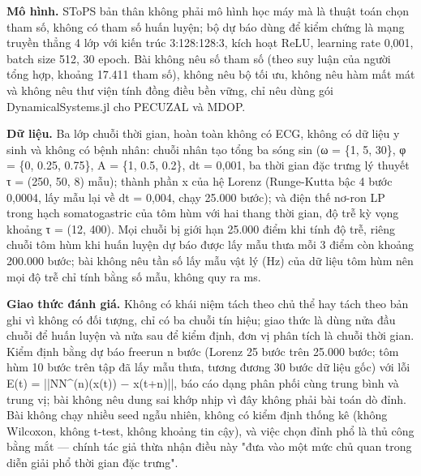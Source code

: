 \documentclass[12pt,a4paper]{article}
\begin{document}
\noindent \textbf{Mô hình.} SToPS bản thân không phải mô hình học máy mà là thuật toán chọn tham số, không có tham số huấn luyện; bộ dự báo dùng để kiểm chứng là mạng truyền thẳng 4 lớp với kiến trúc 3:128:128:3, kích hoạt ReLU, learning rate 0,001, batch size 512, 30 epoch. Bài không nêu số tham số (theo suy luận của người tổng hợp, khoảng 17.411 tham số), không nêu bộ tối ưu, không nêu hàm mất mát và không nêu thư viện tính đồng điều bền vững, chỉ nêu dùng gói DynamicalSystems.jl cho PECUZAL và MDOP.\par\vspace{3pt}
\noindent \textbf{Dữ liệu.} Ba lớp chuỗi thời gian, hoàn toàn không có ECG, không có dữ liệu y sinh và không có bệnh nhân: chuỗi nhân tạo tổng ba sóng sin (ω = \{1, 5, 30\}, φ = \{0, 0.25, 0.75\}, A = \{1, 0.5, 0.2\}, dt = 0,001, ba thời gian đặc trưng lý thuyết τ = (250, 50, 8) mẫu); thành phần x của hệ Lorenz (Runge-Kutta bậc 4 bước 0,0004, lấy mẫu lại về dt = 0,004, chạy 25.000 bước); và điện thế nơ-ron LP trong hạch somatogastric của tôm hùm với hai thang thời gian, độ trễ kỳ vọng khoảng τ = (12, 400). Mọi chuỗi bị giới hạn 25.000 điểm khi tính độ trễ, riêng chuỗi tôm hùm khi huấn luyện dự báo được lấy mẫu thưa mỗi 3 điểm còn khoảng 200.000 bước; bài không nêu tần số lấy mẫu vật lý (Hz) của dữ liệu tôm hùm nên mọi độ trễ chỉ tính bằng số mẫu, không quy ra ms.\par\vspace{3pt}
\noindent \textbf{Giao thức đánh giá.} Không có khái niệm tách theo chủ thể hay tách theo bản ghi vì không có đối tượng, chỉ có ba chuỗi tín hiệu; giao thức là dùng nửa đầu chuỗi để huấn luyện và nửa sau để kiểm định, đơn vị phân tích là chuỗi thời gian. Kiểm định bằng dự báo freerun n bước (Lorenz 25 bước trên 25.000 bước; tôm hùm 10 bước trên tập đã lấy mẫu thưa, tương đương 30 bước dữ liệu gốc) với lỗi E(t) = ||NN\textasciicircum{}(n)(x(t)) − x(t+n)||, báo cáo dạng phân phối cùng trung bình và trung vị; bài không nêu dung sai khớp nhịp vì đây không phải bài toán dò đỉnh. Bài không chạy nhiều seed ngẫu nhiên, không có kiểm định thống kê (không Wilcoxon, không t-test, không khoảng tin cậy), và việc chọn đỉnh phổ là thủ công bằng mắt — chính tác giả thừa nhận điều này "đưa vào một mức chủ quan trong diễn giải phổ thời gian đặc trưng".\par\vspace{3pt}
\end{document}
